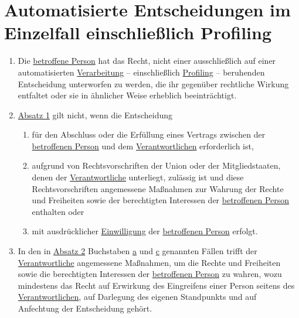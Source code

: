 \chapter{Automatisierte Entscheidungen im Einzelfall einschließlich Profiling}
\label{ch:22}


\begin{enumerate}

  \item Die \hyperref[itm:04-1]{betroffene Person} hat das Recht, nicht einer ausschließlich auf einer
   automatisierten \hyperref[itm:04-2]{Verarbeitung} -- einschließlich \hyperref[itm:04-4]{Profiling} -- beruhenden
   Entscheidung unterworfen zu werden, die ihr gegenüber rechtliche Wirkung entfaltet oder sie in ähnlicher Weise
   erheblich beeinträchtigt.%
  \label{itm:22-1}

  \item \hyperref[itm:22-1]{Absatz 1} gilt nicht, wenn die Entscheidung%
  \label{itm:22-2}

  \begin{enumerate}
  
    \item für den Abschluss oder die Erfüllung eines Vertrags zwischen der \hyperref[itm:04-1]{betroffenen Person} und
     dem \hyperref[itm:04-7]{Verantwortlichen} erforderlich ist,%
    \label{itm:22-2a}

    \item aufgrund von Rechtsvorschriften der Union oder der Mitgliedstaaten, denen der \hyperref[itm:04-7]
     {Verantwortliche} unterliegt, zulässig ist und diese Rechtsvorschriften angemessene Maßnahmen zur Wahrung der
     Rechte und Freiheiten sowie der berechtigten Interessen der \hyperref[itm:04-1]{betroffenen Person} enthalten
     oder%
    \label{itm:22-2b}

    \item mit ausdrücklicher \hyperref[itm:04-11]{Einwilligung} der \hyperref[itm:04-1]{betroffenen Person} erfolgt.%
    \label{itm:22-2c}

  \end{enumerate}

  \item In den in \hyperref[itm:22-2]{Absatz 2} Buchstaben \hyperref[itm:22-2a]{a} und \hyperref[itm:22-2c]{c} genannten
   Fällen trifft der \hyperref[itm:04-7]{Verantwortliche} angemessene Maßnahmen, um die Rechte und Freiheiten sowie die
   berechtigten Interessen der \hyperref[itm:04-1]{betroffenen Person} zu wahren, wozu mindestens das Recht auf
   Erwirkung des Eingreifens einer Person seitens des \hyperref[itm:04-7]{Verantwortlichen}, auf Darlegung des eigenen
   Standpunkts und auf Anfechtung der Entscheidung gehört.%
  \label{itm:22-3}


\end{enumerate}
